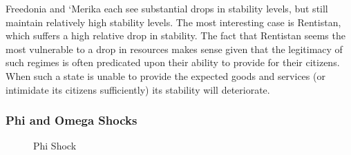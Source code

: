 \documentclass[12pt]{article}
\begin{document}
\begin{spacing}{1.5}
Freedonia and `Merika each see substantial drops in stability levels, but still maintain relatively high stability levels. The most interesting case is Rentistan, which suffers a high relative drop in stability. The fact that Rentistan seems the most vulnerable to a drop in resources makes sense given that the legitimacy of such regimes is often predicated upon their ability to provide for their citizens. When such a state is unable to provide the expected goods and services (or intimidate its citizens sufficiently) its stability will deteriorate. 

\subsubsection{Phi and Omega Shocks} 

\begin{figure}[htb]
\centering 
\caption{Phi Shock}
\end{figure}


\end{spacing}
\end{document}
